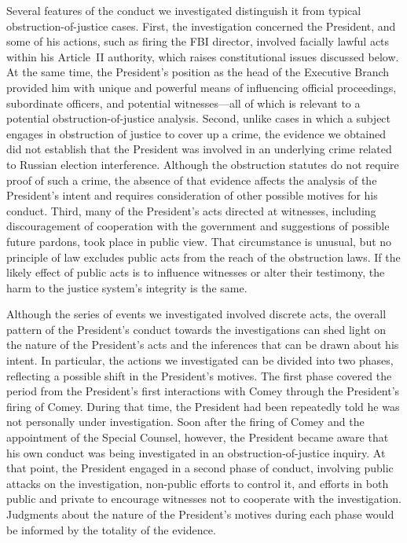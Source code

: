 Several features of the conduct we investigated distinguish it from typical obstruction-of-justice cases.
First, the investigation concerned the President, and some of his actions, such as firing the FBI director, involved facially lawful acts within his Article~II authority, which raises constitutional issues discussed below.
At the same time, the President's position as the head of the Executive Branch provided him with unique and powerful means of influencing official proceedings, subordinate officers, and potential witnesses---all of which is relevant to a potential obstruction-of-justice analysis.
Second, unlike cases in which a subject engages in obstruction of justice to cover up a crime, the evidence we obtained did not establish that the President was involved in an underlying crime related to Russian election interference.
Although the obstruction statutes do not require proof of such a crime, the absence of that evidence affects the analysis of the President's intent and requires consideration of other possible motives for his conduct.
Third, many of the President's acts directed at witnesses, including discouragement of cooperation with the government and suggestions of possible future pardons, took place in public view.
That circumstance is unusual, but no principle of law excludes public acts from the reach of the obstruction laws.
If the likely effect of public acts is to influence witnesses or alter their testimony, the harm to the justice system's integrity is the same.

Although the series of events we investigated involved discrete acts, the overall pattern of the President's conduct towards the investigations can shed light on the nature of the President's acts and the inferences that can be drawn about his intent.
In particular, the actions we investigated can be divided into two phases, reflecting a possible shift in the President's motives.
The first phase covered the period from the President's first interactions with Comey through the President's firing of Comey.
During that time, the President had been repeatedly told he was not personally under investigation.
Soon after the firing of Comey and the appointment of the Special Counsel, however, the President became aware that his own conduct was being investigated in an obstruction-of-justice inquiry.
At that point, the President engaged in a second phase of conduct, involving public attacks on the investigation, non-public efforts to control it, and efforts in both public and private to encourage witnesses not to cooperate with the investigation.
Judgments about the nature of the President's motives during each phase would be informed by the totality of the evidence.

